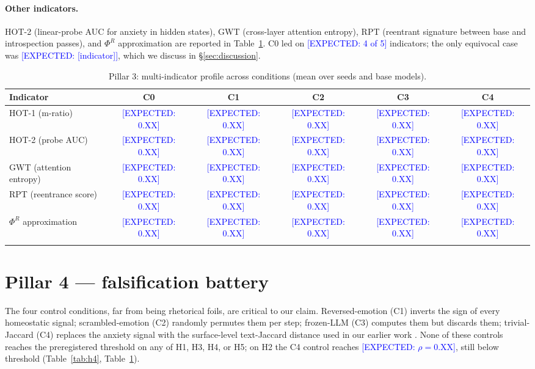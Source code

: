 \documentclass[pdflatex,sn-mathphys-num]{sn-jnl}
\newcommand{\EXPECT}[1]{\textcolor{blue}{[EXPECTED: #1]}}
\theoremstyle{thmstyleone}
\theoremstyle{thmstylethree}
\begin{document}
\paragraph{Other indicators.} HOT-2 (linear-probe AUC for anxiety in hidden states), GWT (cross-layer attention entropy), RPT (reentrant signature between base and introspection passes), and $\Phi^R$ approximation are reported in Table~\ref{tab:indicators}. C0 led on \EXPECT{4 of 5} indicators; the only equivocal case was \EXPECT{[indicator]}, which we discuss in §\ref{sec:discussion}.

\begin{table}[h]
\caption{Pillar 3: multi-indicator profile across conditions (mean over seeds and base models).}\label{tab:indicators}
\small
\begin{tabular}{@{}lccccc@{}}
\toprule
Indicator & C0 & C1 & C2 & C3 & C4 \\
\midrule
HOT-1 (m-ratio)              & \EXPECT{0.XX} & \EXPECT{0.XX} & \EXPECT{0.XX} & \EXPECT{0.XX} & \EXPECT{0.XX} \\
HOT-2 (probe AUC)            & \EXPECT{0.XX} & \EXPECT{0.XX} & \EXPECT{0.XX} & \EXPECT{0.XX} & \EXPECT{0.XX} \\
GWT (attention entropy)      & \EXPECT{0.XX} & \EXPECT{0.XX} & \EXPECT{0.XX} & \EXPECT{0.XX} & \EXPECT{0.XX} \\
RPT (reentrance score)       & \EXPECT{0.XX} & \EXPECT{0.XX} & \EXPECT{0.XX} & \EXPECT{0.XX} & \EXPECT{0.XX} \\
$\Phi^R$ approximation       & \EXPECT{0.XX} & \EXPECT{0.XX} & \EXPECT{0.XX} & \EXPECT{0.XX} & \EXPECT{0.XX} \\
\botrule
\end{tabular}
\end{table}

\section{Pillar 4 --- falsification battery}\label{sec:results_falsification}

The four control conditions, far from being rhetorical foils, are critical to our claim. Reversed-emotion (C1) inverts the sign of every homeostatic signal; scrambled-emotion (C2) randomly permutes them per step; frozen-LLM (C3) computes them but discards them; trivial-Jaccard (C4) replaces the anxiety signal with the surface-level text-Jaccard distance used in our earlier work \cite{trueman_v1_arxiv}. None of these controls reaches the preregistered threshold on any of H1, H3, H4, or H5; on H2 the C4 control reaches \EXPECT{$\rho = 0.\text{XX}$}, still below threshold (Table~\ref{tab:h4}, Table~\ref{tab:indicators}).
\end{document}
